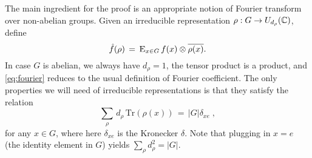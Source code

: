 The main ingredient for the proof is an appropriate notion of Fourier transform over non-abelian groups. Given an irreducible representation $\rho: G \to U_{d_\rho}(\mathbb{C})$, define 
\begin{equation}\label{eq:fourier}
 \hat{f}(\rho) \,=\, \textsc{E}_{x\in G} \,f(x) \otimes \overline{\rho(x)}.
\end{equation}
In case $G$ is abelian, we always have $d_\rho=1$, the tensor product is a product, and \eqref{eq:fourier} reduces to the usual definition of Fourier coefficient. The only properties we will need of irreducible representations is that they satisfy the relation
\begin{equation}\label{eq:ortho}
\sum_\rho \,d_\rho\,\mathrm{Tr}(\rho(x)) \,=\, |G|\delta_{xe}\;,
\end{equation}
for any $x\in G$, where here $\delta_{xe}$ is the Kronecker $\delta$. Note that plugging in $x=e$ (the identity element in $G$) yields $\sum_\rho d_\rho^2= |G|$. 

